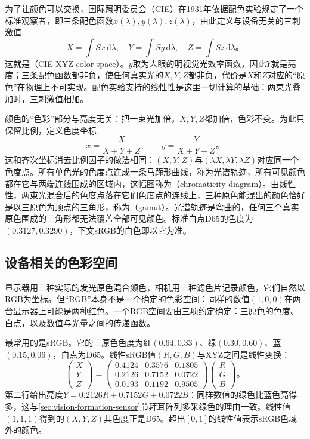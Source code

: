 为了让颜色可以交换，国际照明委员会（CIE）在1931年依据配色实验规定了一个标准观察者，即三条配色函数$\bar x(\lambda),\bar y(\lambda),\bar z(\lambda)$，由此定义与设备无关的三刺激值
\[
  X=\int S\bar x\,\mathrm{d}\lambda,\quad
  Y=\int S\bar y\,\mathrm{d}\lambda,\quad
  Z=\int S\bar z\,\mathrm{d}\lambda\text{。}
\]
这就是（CIE XYZ color space）。$\bar y$取为人眼的明视觉光效率函数，因此$Y$就是亮度；三条配色函数都非负，使任何真实光的$X,Y,Z$都非负，代价是$X$和$Z$对应的“原色”在物理上不可实现。配色实验支持的线性性是这里一切计算的基础：两束光叠加时，三刺激值相加。

颜色的“色彩”部分与亮度无关：把一束光加倍，$X,Y,Z$都加倍，色彩不变。为此只保留比例，定义色度坐标
\begin{equation}
  x=\frac{X}{X+Y+Z},\qquad y=\frac{Y}{X+Y+Z}\text{。}
  \label{eq:vision-formation-chromaticity}
\end{equation}
这和齐次坐标消去比例因子的做法相同：$(X,Y,Z)$与$(\lambda X,\lambda Y,\lambda Z)$对应同一个色度点。所有单色光的色度点连成一条马蹄形曲线，称为光谱轨迹，所有可见颜色都在它与两端连线围成的区域内，这幅图称为（chromaticity diagram）。由线性性，两束光混合后的色度点落在它们色度点的连线上，三种原色能混出的颜色恰好是以三原色为顶点的三角形，称为（gamut）。光谱轨迹是弯曲的，任何三个真实原色围成的三角形都无法覆盖全部可见颜色。标准白点D65的色度为$(0.3127,0.3290)$，下文sRGB的白色即以它为准。

\subsection{设备相关的色彩空间}
\label{sec:vision-formation-color-spaces}

显示器用三种实际的发光原色混合颜色，相机用三种滤色片记录颜色，它们自然以RGB为坐标。但“RGB”本身不是一个确定的色彩空间：同样的数值$(1,0,0)$在两台显示器上可能是两种红色。一个RGB空间要由三项约定确定：三原色的色度、白点，以及数值与光量之间的传递函数。

最常用的是sRGB。它的三原色色度为红$(0.64,0.33)$、绿$(0.30,0.60)$、蓝$(0.15,0.06)$，白点为D65。线性sRGB值$(R,G,B)$与XYZ之间是线性变换：
\begin{equation}
  \begin{pmatrix}X\\Y\\Z\end{pmatrix}=
  \begin{pmatrix}
    0.4124&0.3576&0.1805\\
    0.2126&0.7152&0.0722\\
    0.0193&0.1192&0.9505
  \end{pmatrix}
  \begin{pmatrix}R\\G\\B\end{pmatrix}\text{。}
  \label{eq:vision-formation-srgb-xyz}
\end{equation}
第二行给出亮度$Y=0.2126R+0.7152G+0.0722B$：同样数值的绿色比蓝色亮得多，这与\ref{sec:vision-formation-sensor}节拜耳阵列多采绿色的理由一致。线性值$(1,1,1)$得到的$(X,Y,Z)$其色度正是D65。超出$[0,1]$的线性值表示sRGB色域外的颜色。

